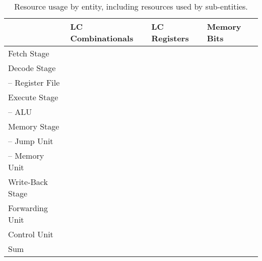 \begin{table}[htb]
  \centering
  \caption{Resource usage by entity, including resources used by sub-entities.}
  \begin{tabular}{llll}
    \toprule
                         & LC Combinationals & LC Registers & Memory Bits \\
    \midrule
    Fetch Stage          &                   &              &             \\
    Decode Stage         &                   &              &             \\
    -- Register File     &                   &              &             \\
    Execute Stage        &                   &              &             \\
    -- ALU               &                   &              &             \\
    Memory Stage         &                   &              &             \\
    -- Jump Unit         &                   &              &             \\
    -- Memory Unit       &                   &              &             \\
    Write-Back Stage     &                   &              &             \\
    Forwarding Unit      &                   &              &             \\
    Control Unit         &                   &              &             \\
    \cmidrule{1-4}
    Sum                  &                   &              &             \\
    \bottomrule
  \end{tabular}
\end{table}

\begin{qa}
  \answer{}
  \answer{}
\end{qa}
